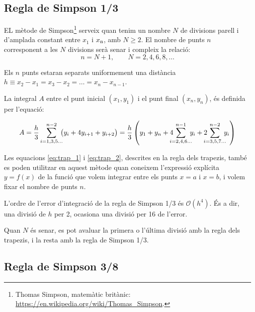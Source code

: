 \subsection{Regla de Simpson 1/3}

EL mètode de Simpson\footnote{Thomas Simpson, matemàtic britànic: \href{https://en.wikipedia.org/wiki/Thomas_Simpson}{https:/\!\!/en.wikipedia.org/wiki/Thomas\_Simpson}.} serveix quan tenim un nombre  $N$ de divisions parell i d'amplada constant entre $x_1$ i $x_\mathrm{n}$, amb $N \geq 2$.  El nombre de punts $n$ corresponent a les  $N$ divisions serà senar i compleix la relació: 
\begin{equation}
	n = N+1, \qquad N = 2, 4, 6, 8, \dots
\end{equation}

Els $n$ punts estaran separats uniformement una distància $h \equiv x_2-x_1 = x_3-x_2 = \dots = x_n-x_{n-1}$.

La integral $A$ entre el punt inicial $(x_1, y_1)$ i el punt final $(x_n, y_n)$, és definida per l'equació:

 \begin{equation}\label{eq:simp_1_3}
   A =  \frac{h}{3} \sum_{i=1,3,5\dots}^{n-2} \hspace{-0.5em} \big( y_i + 4 y_{i+1} + y_{i+2} \big) =
   \frac{h}{3} \left( y_1 + y_n + 4 \hspace{-0.7em} \sum_{i=2,4,6\dots}^{n-1} \hspace{-0.5em} y_i +
   2 \hspace{-0.7em} \sum_{i=3,5,7\dots}^{n-2} \hspace{-0.5em} y_i \right)
 \end{equation}

Les equacions \eqref{eq:trap_1} i \eqref{eq:trap_2}, descrites en la regla dels trapezis, també es poden utilitzar en aquest mètode quan  coneixem l'expressió explícita $y=f(x)$ de la funció que volem integrar entre els punts $x=a$ i $x=b$, i volem fixar el nombre de punts $n$.

L'ordre de l'error d'integració de la regla de Simpson 1/3 és $\mathscr{O}(h^4)$. És a dir, una divisió de $h$ per 2, ocasiona una divisió per 16 de l'error.

Quan $N$ és senar, es pot avaluar la primera o l'última divisió amb la  regla dels trapezis, i la resta amb la regla de Simpson 1/3.

 \subsection{Regla de Simpson 3/8}

